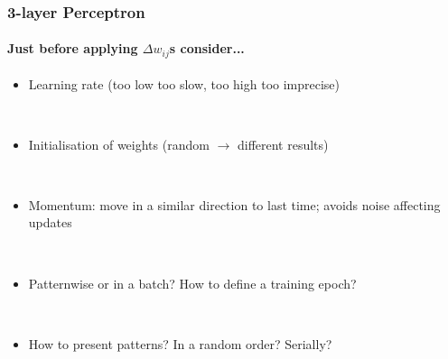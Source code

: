 \documentclass{beamer}
\newcommand{\figheight}{0.72\textheight}
\begin{document}
\begin{frame}[fragile]
\begin{columns}[T]
\begin{column}{.55\textwidth}
\begin{figure}[t]
\begin{flushleft}

 \end{flushleft}
\end{figure}
\end{column}

\end{columns}
\end{frame}

\begin{frame}[fragile]
\frametitle{3-layer Perceptron}
\framesubtitle{Just before applying $\Delta w_{ij}$s consider...
}
\begin{itemize}[<+->]

\item Learning rate (too low too slow, too high too imprecise) 

\ \\

\item Initialisation of weights (random $\rightarrow$ different results) 

\ \\

\item Momentum:  move in a similar direction to last time; avoids noise affecting updates 

\ \\

\item Patternwise or in a batch? How to define a training epoch? 

\ \\

\item How to present patterns? In a random order? Serially?
\end{itemize}

\end{frame}
\end{document}
